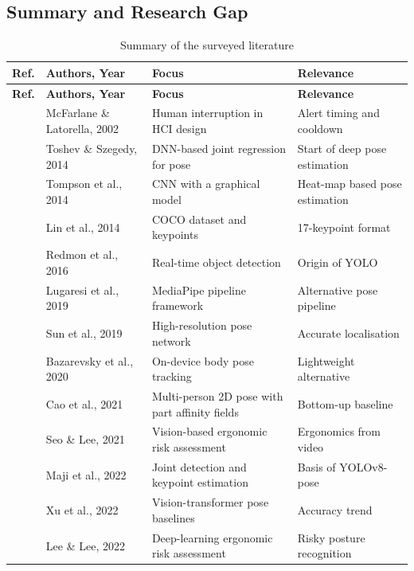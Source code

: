 ﻿\documentclass[12pt,a4paper]{article}
\begin{document}
\subsection{Summary and Research Gap}
\begingroup
\footnotesize
{}
\begin{longtable}{|p{0.9cm}|p{3.0cm}|p{5.4cm}|p{4.2cm}|}
\caption{Summary of the surveyed literature}\label{tab:litsum}\\
\hline
\textbf{Ref.} & \textbf{Authors, Year} & \textbf{Focus} & \textbf{Relevance}\\ \hline
\endfirsthead
\hline
\textbf{Ref.} & \textbf{Authors, Year} & \textbf{Focus} & \textbf{Relevance}\\ \hline
\endhead
\hline
\endfoot
\cite{mcfarlane2002scope} & McFarlane \& Latorella, 2002 & Human interruption in HCI design & Alert timing and cooldown\\ \hline
\cite{deeppose} & Toshev \& Szegedy, 2014 & DNN-based joint regression for pose & Start of deep pose estimation\\ \hline
\cite{tompson2014joint} & Tompson et al., 2014 & CNN with a graphical model & Heat-map based pose estimation\\ \hline
\cite{cocodataset} & Lin et al., 2014 & COCO dataset and keypoints & 17-keypoint format\\ \hline
\cite{redmon2016you} & Redmon et al., 2016 & Real-time object detection & Origin of YOLO\\ \hline
\cite{lugaresi2019mediapipe} & Lugaresi et al., 2019 & MediaPipe pipeline framework & Alternative pose pipeline\\ \hline
\cite{hrnet} & Sun et al., 2019 & High-resolution pose network & Accurate localisation\\ \hline
\cite{blazepose} & Bazarevsky et al., 2020 & On-device body pose tracking & Lightweight alternative\\ \hline
\cite{openpose} & Cao et al., 2021 & Multi-person 2D pose with part affinity fields & Bottom-up baseline\\ \hline
\cite{seo2021automated} & Seo \& Lee, 2021 & Vision-based ergonomic risk assessment & Ergonomics from video\\ \hline
\cite{maji2022yolopose} & Maji et al., 2022 & Joint detection and keypoint estimation & Basis of YOLOv8-pose\\ \hline
\cite{vitpose} & Xu et al., 2022 & Vision-transformer pose baselines & Accuracy trend\\ \hline
\cite{lee2022see} & Lee \& Lee, 2022 & Deep-learning ergonomic risk assessment & Risky posture recognition\\ \hline

\end{longtable}
\end{document}
